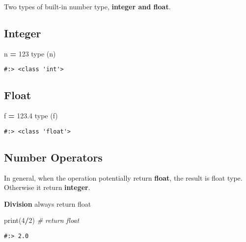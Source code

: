 \documentclass[
]{book}
\newenvironment{Shaded}{\begin{snugshade}}{\end{snugshade}}
\newcommand{\BuiltInTok}[1]{#1}
\newcommand{\CommentTok}[1]{\textcolor[rgb]{0.37,0.37,0.37}{\textit{#1}}}
\newcommand{\DecValTok}[1]{\textcolor[rgb]{0.06,0.06,0.06}{#1}}
\newcommand{\FloatTok}[1]{\textcolor[rgb]{0.06,0.06,0.06}{#1}}
\newcommand{\NormalTok}[1]{#1}
\newcommand{\OperatorTok}[1]{\textcolor[rgb]{0.43,0.43,0.43}{\textbf{#1}}}
\begin{document}
Two types of built-in number type, \textbf{integer and float}.

\hypertarget{integer}{%
\subsection{Integer}\label{integer}}

\begin{Shaded}
\begin{Highlighting}[]
\NormalTok{n }\OperatorTok{=} \DecValTok{123}
\BuiltInTok{type}\NormalTok{ (n)}
\end{Highlighting}
\end{Shaded}

\begin{verbatim}
#:> <class 'int'>
\end{verbatim}

\hypertarget{float}{%
\subsection{Float}\label{float}}

\begin{Shaded}
\begin{Highlighting}[]
\NormalTok{f }\OperatorTok{=} \FloatTok{123.4}
\BuiltInTok{type}\NormalTok{ (f)}
\end{Highlighting}
\end{Shaded}

\begin{verbatim}
#:> <class 'float'>
\end{verbatim}

\hypertarget{number-operators}{%
\subsection{Number Operators}\label{number-operators}}

In general, when the operation potentially return \textbf{float}, the result is float type. Otherwise it return \textbf{integer}.

\textbf{Division} always return float

\begin{Shaded}
\begin{Highlighting}[]
\BuiltInTok{print}\NormalTok{(}\DecValTok{4}\OperatorTok{/}\DecValTok{2}\NormalTok{)  }\CommentTok{\# return float}
\end{Highlighting}
\end{Shaded}

\begin{verbatim}
#:> 2.0
\end{verbatim}
\end{document}
